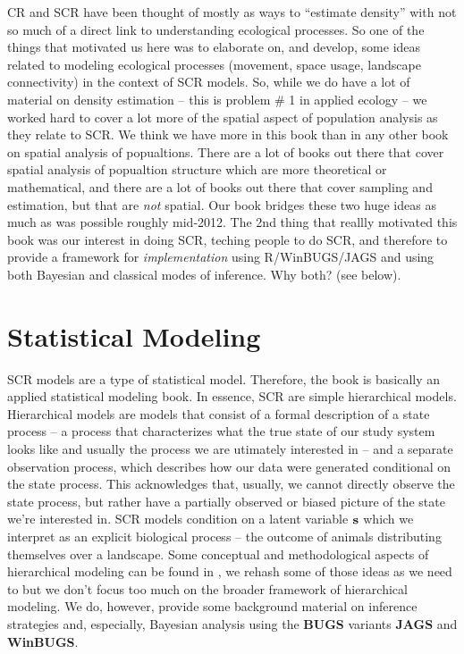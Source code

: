 CR and SCR have been thought of mostly as ways to ``estimate density''
with not so much of a direct link to understanding ecological
processes. So one of the things that motivated us here was to
elaborate on, and develop, some ideas related to modeling ecological
processes (movement, space usage, landscape connectivity) in the
context of SCR models.  So, while we do have a lot of material on
density estimation -- this is problem \# 1 in applied ecology -- we
worked hard to cover a lot more of the spatial aspect of population
analysis as they relate to SCR. We think we have more in this book
than in any other book on spatial analysis of popualtions. There are a
lot of books out there that cover spatial analysis of popualtion
structure which are more theoretical or mathematical, and there are a
lot of books out there that cover sampling and estimation, but that
are {\it not} spatial. Our book bridges these two huge ideas as much
as was possible roughly mid-2012.  The 2nd thing that reallly
motivated this book was our interest in doing SCR, teching people to
do SCR, and therefore to provide a framework for {\it implementation}
using R/WinBUGS/JAGS and using both Bayesian and classical modes of
inference.  Why both?  (see below).

\section*{Statistical Modeling}

SCR models are a type of statistical model. Therefore, the book is
basically an applied statistical modeling book.  In essence, SCR are
simple hierarchical models.  Hierarchical models are models that
consist of a formal description of a state process -- a process that
characterizes what the true state of our study system looks like and
usually the process we are utimately interested in -- and a separate
observation process, which describes how our data were generated
conditional on the state process. This acknowledges that, usually, we
cannot directly observe the state process, but rather have a partially
observed or biased picture of the state we're interested in.  SCR
models condition on a latent variable ${\bf s}$ which we interpret as
an explicit biological process -- the outcome of animals distributing
themselves over a landscape.  Some conceptual and methodological
aspects of hierarchical modeling can be found in
\citet{royle_dorazio:2008}, we rehash some of those ideas as we need
to but we don't focus too much on the broader framework of
hierarchical modeling.  We do, however, provide some background
material on inference strategies and, especially, Bayesian analysis
using the {\bf BUGS} variants {\bf JAGS} and {\bf WinBUGS}.

